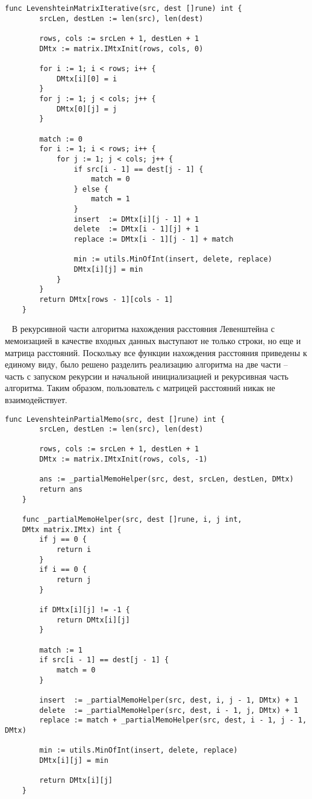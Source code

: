 \begin{lstlisting}[label=matrix-iter,caption=Программный код нахождения расстояния Левенштейна итеративно]
	func LevenshteinMatrixIterative(src, dest []rune) int {
		srcLen, destLen := len(src), len(dest)
		
		rows, cols := srcLen + 1, destLen + 1
		DMtx := matrix.IMtxInit(rows, cols, 0)
		
		for i := 1; i < rows; i++ {
			DMtx[i][0] = i
		}
		for j := 1; j < cols; j++ {
			DMtx[0][j] = j
		}
		
		match := 0
		for i := 1; i < rows; i++ {
			for j := 1; j < cols; j++ {
				if src[i - 1] == dest[j - 1] {
					match = 0
				} else {
					match = 1
				}
				insert  := DMtx[i][j - 1] + 1
				delete  := DMtx[i - 1][j] + 1
				replace := DMtx[i - 1][j - 1] + match
				
				min := utils.MinOfInt(insert, delete, replace)
				DMtx[i][j] = min
			}
		}
		return DMtx[rows - 1][cols - 1]
	}
\end{lstlisting}
~\newline
В рекурсивной части алгоритма нахождения расстояния Левенштейна с мемоизацией в качестве входных данных выступают не только строки, но еще и матрица расстояний. Поскольку все функции нахождения расстояния приведены к единому виду, было решено разделить реализацию алгоритма на две части -- часть с запуском рекурсии и начальной инициализацией и рекурсивная часть алгоритма. Таким образом, пользователь с матрицей расстояний никак не взаимодействует.
\newline
\begin{lstlisting}[label=memo-helper,caption=Программный код нахождения расстояния Левенштейна с мемоизацией]
	func LevenshteinPartialMemo(src, dest []rune) int {
		srcLen, destLen := len(src), len(dest)
		
		rows, cols := srcLen + 1, destLen + 1
		DMtx := matrix.IMtxInit(rows, cols, -1)
		
		ans := _partialMemoHelper(src, dest, srcLen, destLen, DMtx)
		return ans
	}
	
	func _partialMemoHelper(src, dest []rune, i, j int, 
	DMtx matrix.IMtx) int {
		if j == 0 {
			return i
		}
		if i == 0 {
			return j
		}
		
		if DMtx[i][j] != -1 {
			return DMtx[i][j]
		}
		
		match := 1
		if src[i - 1] == dest[j - 1] {
			match = 0
		}
		
		insert  := _partialMemoHelper(src, dest, i, j - 1, DMtx) + 1
		delete  := _partialMemoHelper(src, dest, i - 1, j, DMtx) + 1
		replace := match + _partialMemoHelper(src, dest, i - 1, j - 1, DMtx)
		
		min := utils.MinOfInt(insert, delete, replace)
		DMtx[i][j] = min
		
		return DMtx[i][j]
	}
\end{lstlisting}
